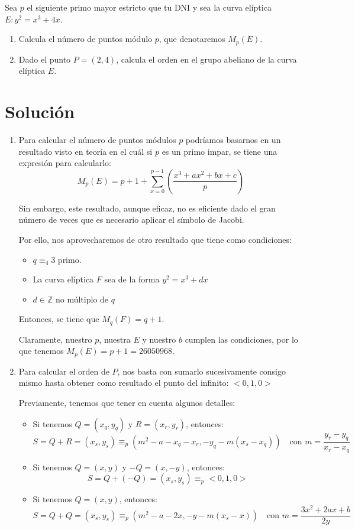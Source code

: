 	Sea $p$ el siguiente primo mayor estricto que tu DNI y sea la curva elíptica $E: y^2 = x^3 + 4x$.
	\begin{enumerate}
		\item Calcula el número de puntos módulo $p$, que denotaremos $M_p(E)$.
		\item Dado el punto $P = (2,4)$, calcula el orden en el grupo abeliano de la curva elíptica $E$.
	\end{enumerate}
	
\section*{Solución}
	\begin{enumerate}
		\item Para calcular el número de puntos módulos $p$ podríamos basarnos en un resultado visto en teoría
		en el cuál si $p$ es un primo impar, se tiene una expresión para calcularlo:
		$$\displaystyle M_p(E) = p + 1 + \sum_{x=0}^{p-1} \left( \frac{x^3 + ax^2 + bx + c}{p} \right)$$
		
		Sin embargo, este resultado, aunque eficaz, no es eficiente dado el gran número de veces que es necesario
		aplicar el símbolo de Jacobi.
		
		Por ello, nos aprovecharemos de otro resultado que tiene como condiciones:
		\begin{itemize}
			\item $q \equiv_4 3$ primo.
			\item La curva elíptica $F$ sea de la forma $y^2 = x^3 + dx$
			\item $d \in \mathbb{Z}$ no múltiplo de $q$
		\end{itemize}
		Entonces, se tiene que $M_q(F) = q+1$.

		Claramente, nuestro $p$, nuestra $E$ y nuestro $b$ cumplen las condiciones, por lo que tenemos $M_p(E)
		= p+1 = 26050968$.
		
		\item Para calcular el orden de $P$, nos basta con sumarlo sucesivamente consigo mismo hasta obtener
		como resultado el punto del infinito: $<0, 1, 0>$
		
		Previamente, tenemos que tener en cuenta algunos detalles:
		\begin{itemize}
			\item Si tenemos $Q = (x_q, y_q)$ y $R = (x_r, y_r)$, entonces:
			$$S = Q + R = (x_s, y_s) \equiv_p (m^2 - a - x_q - x_r, -y_q - m(x_s - x_q)) \quad \text{con }
			m=\frac{y_r - y_q}{x_r - x_q}$$
			\item Si tenemos $Q = (x, y)$ y $-Q = (x, -y)$, entonces:
			$$S = Q + (-Q) = (x_s, y_s) \equiv_p <0, 1, 0>$$
			\item Si tenemos $Q = (x, y)$, entonces:
			$$S = Q + Q = (x_s, y_s) \equiv_p (m^2 - a - 2x, -y - m(x_s - x)) \quad \text{con }
			m=\frac{3x^2 + 2ax + b}{2y}$$
		\end{itemize}
		

\end{enumerate}
